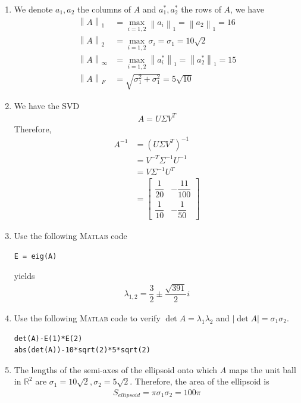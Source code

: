 \documentclass[a4paper,oneside]{book}
\numberwithin{equation}{chapter}
\begin{document}
\begin{enumerate}
\begin{center}
\end{center}
\item We denote $a_1,a_2$ the columns of $A$ and $a_1^*,a_2^*$ the rows of $A$, we have
\begin{align}
{\left\| A \right\|_1} &= \mathop {\max }\limits_{i = 1,2} {\left\| {{a_i}} \right\|_1} = {\left\| {{a_2}} \right\|_1} = 16\\
{\left\| A \right\|_2} &= \mathop {\max }\limits_{i = 1,2} {\sigma _i} = {\sigma _1} = 10\sqrt 2 \\
{\left\| A \right\|_\infty } &= \mathop {\max }\limits_{i = 1,2} {\left\| {a_i^*} \right\|_1} = {\left\| {a_2^*} \right\|_1} = 15\\
{\left\| A \right\|_F} &= \sqrt {\sigma _1^2 + \sigma _1^2}  = 5\sqrt {10} 
\end{align}
\item We have the SVD
\begin{align}
A=U\Sigma V^T
\end{align}
Therefore,
\begin{align}
{A^{ - 1}} &= {\left( {U\Sigma {V^T}} \right)^{ - 1}}\\
& = {V^{ - T}}{\Sigma ^{ - 1}}{U^{ - 1}}\\
& = V{\Sigma ^{ - 1}}{U^T}\\
& = \left[ {\begin{array}{*{20}{c}}
{\dfrac{1}{{20}}}&{ - \dfrac{{11}}{{100}}}\\
{\dfrac{1}{{10}}}&{ - \dfrac{1}{{50}}}
\end{array}} \right]
\end{align}
\item Use the following \textsc{Matlab} code
\begin{verbatim}
E = eig(A)
\end{verbatim}
yields
\begin{align}
{\lambda _{1,2}} = \dfrac{3}{2} \pm \dfrac{{\sqrt {391} }}{2}i
\end{align}
\item Use the following \textsc{Matlab} code to verify $\det A=\lambda _1 \lambda _2$ and $\left| {\det A} \right| = {\sigma _1}{\sigma _2}$.
\begin{verbatim}
det(A)-E(1)*E(2)
abs(det(A))-10*sqrt(2)*5*sqrt(2)
\end{verbatim}
\item The lengths of the semi-axes of the ellipsoid onto which $A$ maps the unit ball in $\mathbb{R}^2$ are ${\sigma _1} = 10\sqrt 2 ,{\sigma _2} = 5\sqrt 2 $. Therefore, the area of the ellipsoid is 
\begin{align}
{S_{ellipsoid}} = \pi {\sigma _1}{\sigma _2} = 100\pi 
\end{align}
\end{enumerate}
\end{document}
